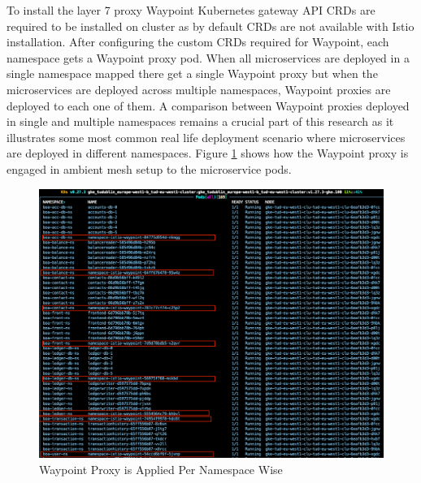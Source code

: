 To install the layer 7 proxy Waypoint Kubernetes gateway API CRDs are required to be installed on cluster as by default CRDs are not available with Istio installation. After configuring the custom CRDs required for Waypoint, each namespace gets a Waypoint proxy pod. When all microservices are deployed in a single namespace mapped there get a single Waypoint proxy but when the microservices are deployed across multiple namespaces, Waypoint proxies are deployed to each one of them. A comparison between Waypoint proxies deployed in single and multiple namespaces remains a crucial part of this research as it illustrates some most common real life deployment scenario where microservices are deployed in different namespaces. Figure \ref{method:waypointAppliedView} shows how the Waypoint proxy is engaged in ambient mesh setup to the microservice pods.

\begin{figure}[ht!]
    \centering
    \includegraphics[width=1.0\linewidth]{resources/ambient-multi-ns-l4-l7-deployed.png}
    \caption{Waypoint Proxy is Applied Per Namespace Wise}
    \label{method:waypointAppliedView}
\end{figure}

